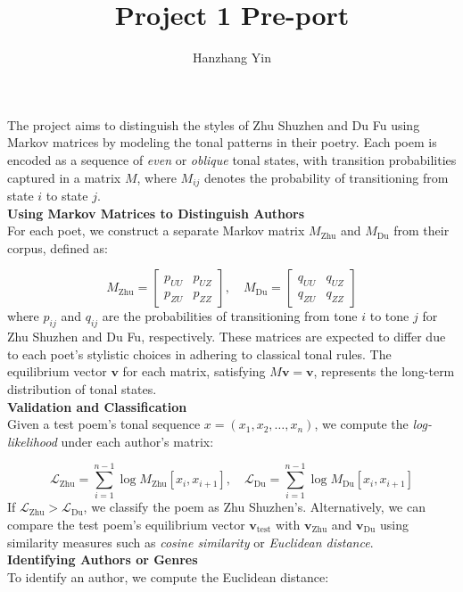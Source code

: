 \documentclass[12pt]{article}
\title{\vspace{-2cm}Project 1 Pre-port}
\author{Hanzhang Yin}
\begin{document}
\maketitle

The project aims to distinguish the styles of Zhu Shuzhen and Du Fu using Markov matrices by modeling the tonal patterns in their poetry. Each poem is encoded as a sequence of \textit{even} or \textit{oblique} tonal states, with transition probabilities captured in a matrix $M$, where $M_{ij}$ denotes the probability of transitioning from state $i$ to state $j$.
\\
\textbf{Using Markov Matrices to Distinguish Authors}
\\
For each poet, we construct a separate Markov matrix $M_{\text{Zhu}}$ and $M_{\text{Du}}$ from their corpus, defined as:

\[
    M_{\text{Zhu}} = \begin{bmatrix} p_{UU} & p_{UZ} \\ p_{ZU} & p_{ZZ} \end{bmatrix}, \quad M_{\text{Du}} = \begin{bmatrix} q_{UU} & q_{UZ} \\ q_{ZU} & q_{ZZ} \end{bmatrix}
\]
where $p_{ij}$ and $q_{ij}$ are the probabilities of transitioning from tone $i$ to tone $j$ for Zhu Shuzhen and Du Fu, respectively. These matrices are expected to differ due to each poet's stylistic choices in adhering to classical tonal rules. The equilibrium vector $\mathbf{v}$ for each matrix, satisfying $M \mathbf{v} = \mathbf{v}$, represents the long-term distribution of tonal states.
\\
\textbf{Validation and Classification}
\\
Given a test poem's tonal sequence $x = (x_1, x_2, \ldots, x_n)$, we compute the \textit{log-likelihood} under each author's matrix:

\[
    \mathcal{L}_{\text{Zhu}} = \sum_{i=1}^{n-1} \log M_{\text{Zhu}}[x_i, x_{i+1}], \quad \mathcal{L}_{\text{Du}} = \sum_{i=1}^{n-1} \log M_{\text{Du}}[x_i, x_{i+1}]
\]
If $\mathcal{L}_{\text{Zhu}} > \mathcal{L}_{\text{Du}}$, we classify the poem as Zhu Shuzhen's. Alternatively, we can compare the test poem’s equilibrium vector $\mathbf{v}_{\text{test}}$ with $\mathbf{v}_{\text{Zhu}}$ and $\mathbf{v}_{\text{Du}}$ using similarity measures such as \textit{cosine similarity} or \textit{Euclidean distance}.
\\
\textbf{Identifying Authors or Genres}
\\
To identify an author, we compute the Euclidean distance:
\end{document}
